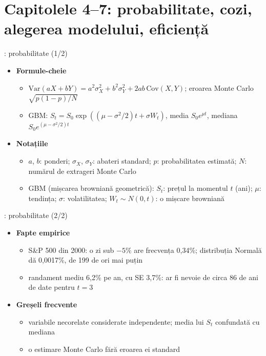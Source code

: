 \section{Capitolele 4--7: probabilitate, cozi, alegerea modelului, eficiență}

\begin{frame}{: probabilitate (1/2)}
\itemsize{\small}
\begin{itemize}
    \item \textbf{Formule-cheie}
    \begin{itemize}
        \item $\mathrm{Var}(aX + bY) = a^2\sigma_X^2 + b^2\sigma_Y^2 + 2ab\,\mathrm{Cov}(X, Y)$; eroarea Monte Carlo $\sqrt{p(1 - p)/N}$
        \item GBM: $S_t = S_0\exp((\mu - \sigma^2/2)t + \sigma W_t)$, media $S_0e^{\mu t}$, mediana $S_0e^{(\mu - \sigma^2/2)t}$
    \end{itemize}
    \item \textbf{Notațiile}
    \begin{itemize}
        \item $a$, $b$: ponderi; $\sigma_X$, $\sigma_Y$: abateri standard; $p$: probabilitatea estimată; $N$: numărul de extrageri Monte Carlo
        \item GBM (mișcarea browniană geometrică): $S_t$: prețul la momentul $t$ (ani); $\mu$: tendința; $\sigma$: volatilitatea; $W_t \sim N(0, t)$: o mișcare browniană
    \end{itemize}
\end{itemize}
\end{frame}

\begin{frame}{: probabilitate (2/2)}
\itemsize{\small}
\begin{itemize}
    \item \textbf{Fapte empirice}
    \begin{itemize}
        \item S\&P 500 din 2000: o zi sub $-5\%$ are frecvența 0{,}34\%; distribuția Normală dă 0{,}0017\%, de 199 de ori mai puțin
        \item randament mediu 6{,}2\% pe an, cu SE 3{,}7\%: ar fi nevoie de circa 86 de ani de date pentru $t = 3$
    \end{itemize}
    \item \textbf{Greșeli frecvente}
    \begin{itemize}
        \item variabile necorelate considerate independente; media lui $S_t$ confundată cu mediana
        \item o estimare Monte Carlo fără eroarea ei standard
    \end{itemize}
\end{itemize}
\end{frame}

